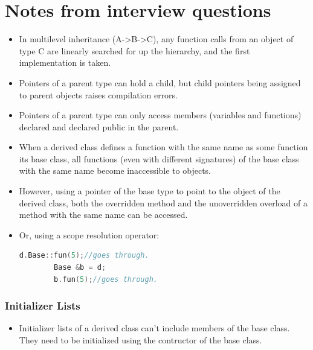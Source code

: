 \documentclass{report}
\begin{document}
\section{Notes from interview questions}
\begin{itemize}
    \item In multilevel inheritance (A->B->C), any function calls from an object of type C are linearly searched for up the hierarchy, and the first implementation is taken.
    \item Pointers of a parent type can hold a child, but child pointers being assigned to parent objects raises compilation errors.
    \item Pointers of a parent type can only access members (variables and functions) declared and declared public in the parent.
    \item When a derived class defines a function with the same name as some function its base class, all functions (even with different signatures) of the base class with the same name become inaccessible to objects.
    \item However, using a pointer of the base type to point to the object of the derived class, both the overridden method and the unoverridden overload of a method with the same name can be accessed.
    \item Or, using a scope resolution operator:
    \begin{lstlisting}[language=C++]
        d.Base::fun(5);//goes through.
        Base &b = d;
        b.fun(5);//goes through.
    \end{lstlisting}
\end{itemize}
\subsubsection{Initializer Lists}
\begin{itemize}
\item Initializer lists of a derived class can't
include members of the base class. They need to be initialized using the contructor of the base class.
\end{itemize}
\end{document}
